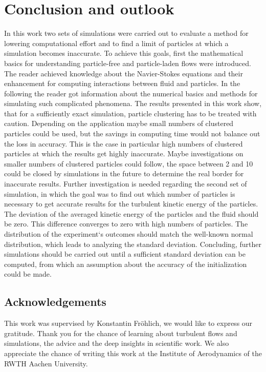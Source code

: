 \documentclass[11pt,a4paper,openany,oneside,parskip=half*]{article}
\begin{document}
\section{Conclusion and outlook}
In this work two sets of simulations were carried out to evaluate a method for lowering computational effort and to find a limit of particles at which a simulation becomes inaccurate. 
\newline
To achieve this goals, first the mathematical basics for understanding particle-free and particle-laden flows were introduced. The reader achieved knowledge about the Navier-Stokes equations and their enhancement for computing interactions between fluid and particles. In the following the reader got information about the numerical basics and methods for simulating such complicated phenomena. 
\newline
The results presented in this work show, that for a sufficiently exact simulation, particle clustering has to be treated with caution. Depending on the application maybe small numbers of clustered particles could be used, but the savings in computing time would not balance out the loss in accuracy. This is the case in particular high numbers of clustered particles at which the results get highly inaccurate. Maybe investigations on smaller numbers of clustered particles could follow, the space between 2 and 10 could be closed by simulations in the future to determine the real border for inaccurate results. 
\newline
Further investigation is needed regarding the second set of simulation, in which the goal was to find out which number of particles is necessary to get accurate results for the turbulent kinetic energy of the particles. The deviation of the averaged kinetic energy of the particles and the fluid should be zero. This difference converges to zero with high numbers of particles. The distribution of the experiment`s outcomes should match the well-known normal distribution, which leads to analyzing the standard deviation. Concluding, further simulations should be carried out until a sufficient standard deviation can be computed, from which an assumption about the accuracy of the initialization could be made.
\subsection*{Acknowledgements}
This work was supervised by Konstantin Fr\"ohlich, we would like to express our gratitude. Thank you for the chance of learning about turbulent flows and simulations, the advice and the deep insights in scientific work. We also appreciate the chance of writing this work at the Institute of Aerodynamics of the RWTH Aachen University.
\pagebreak
\end{document}
